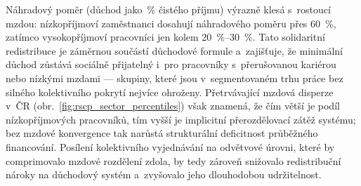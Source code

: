 Náhradový poměr (důchod jako~\% čistého příjmu) výrazně klesá s~rostoucí mzdou: nízkopříjmoví zaměstnanci dosahují náhradového poměru přes \SI{60}{\percent}, zatímco vysoko­příjmoví pracovníci jen kolem \SIrange{20}{30}{\percent}.
Tato solidaritní redistribuce je záměrnou součástí důchodové formule a~zajišťuje, že minimální důchod zůstává sociálně přijatelný i~pro pracovníky s~přerušovanou kariérou nebo nízkými mzdami --- skupiny, které jsou v~segmentovaném trhu práce bez silného kolektivního pokrytí nejvíce ohroženy.
Přetrvávající mzdová disper­ze v~ČR (obr.~\ref{fig:rscp_sector_percentiles}) však znamená, že čím větší je podíl nízkopříjmových pracovníků, tím vyšší je implicitní přerozdělovací zátěž systému; bez mzdové konvergence tak narůstá strukturální deficitnost průběžného financování.
Posílení kolektivního vyjednávání na odvětvové úrovni, které by comprimovalo mzdové rozdělení zdola, by tedy zároveň snižovalo redistribuční nároky na důchodový systém a~zvyšovalo jeho dlouhodobou udržitelnost.


